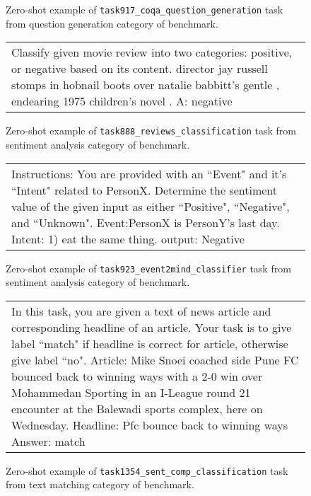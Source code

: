 \begin{figure}[h]
\begin{tabular}{p{}}
\end{tabular}
\caption{Zero-shot example of \texttt{task917\_coqa\_question\_generation} task from question generation category of \natins benchmark.}
\end{figure}




\begin{figure}[h]
\centering
\begin{tabular}{p{}}
\cellcolor{oldlace} Classify given movie review into two categories: positive, or negative based on its content.\vspace{1pt} \newline director jay russell stomps in hobnail boots over natalie babbitt's gentle , endearing 1975 children's novel . A: \textcolor{cadmiumgreen}{negative} \\
\end{tabular}
\caption{Zero-shot example of \texttt{task888\_reviews\_classification} task from sentiment analysis category of \natins benchmark.}
\end{figure}




\begin{figure}[h]
\centering
\begin{tabular}{p{}}
\cellcolor{oldlace} Instructions: You are provided with an ``Event" and it's ``Intent" related to PersonX. Determine the sentiment value of the given input as either ``Positive", ``Negative", and ``Unknown". \vspace{1pt} \newline Event:PersonX is PersonY's last day. Intent: 1) eat the same thing.\vspace{1pt} \newline output: \textcolor{cadmiumgreen}{Negative} \\
\end{tabular}
\caption{Zero-shot example of \texttt{task923\_event2mind\_classifier} task from sentiment analysis category of \natins benchmark.}
\end{figure}




\begin{figure}[h]
\centering
\begin{tabular}{p{}}
\cellcolor{oldlace} In this task, you are given a text of news article and corresponding headline of an article. Your task is to give label ``match" if headline is correct for article, otherwise give label ``no".\vspace{1pt} \newline Article: Mike Snoei coached side Pune FC bounced back to winning ways with a 2-0 win over Mohammedan Sporting in an I-League round 21 encounter at the Balewadi sports complex, here on Wednesday. Headline: Pfc bounce back to winning ways Answer: \textcolor{cadmiumgreen}{match} \\
\end{tabular}
\caption{Zero-shot example of \texttt{task1354\_sent\_comp\_classification} task from text matching category of \natins benchmark.}
\end{figure}




